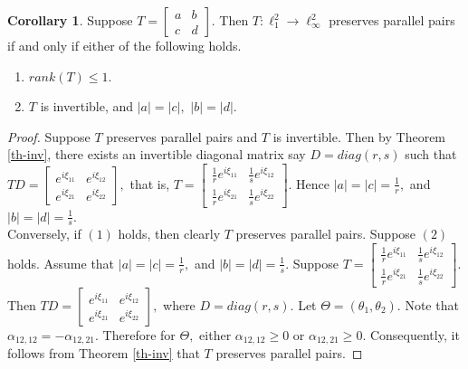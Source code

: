 \documentclass{amsart}
\theoremstyle{definition}
\newtheorem{cor}[theorem]{Corollary}
\theoremstyle{remark}
\numberwithin{equation}{section}
\begin{document}
\begin{cor}
	Suppose $T=\begin{bmatrix}
		a&b\\
		c&d
	\end{bmatrix}.$  Then $T:\ell_1^2\to \ell_\infty^2$ preserves parallel pairs if and only if either of the following holds.
\begin{enumerate}
	\item $rank(T)\leq 1.$
	\item $T$ is invertible, and $|a|=|c|,$ $ |b|=|d|.$
	\end{enumerate}
\end{cor}
\begin{proof}
	Suppose $T$ preserves parallel pairs and $T$ is invertible. Then by Theorem \ref{th-inv}, there exists an invertible diagonal matrix say $D=diag(r,s)$ such that $TD=\begin{bmatrix}
		e^{i\xi_{11}}&e^{i\xi_{12}}\\
		e^{i\xi_{21}}&e^{i\xi_{22}}
	\end{bmatrix},$ that is, 	$T=\begin{bmatrix}
		\frac{1}{r}e^{i\xi_{11}}& \frac{1}{s} e^{i\xi_{12}}\\
		\frac{1}{r} e^{i\xi_{21}}& \frac{1}{s} e^{i\xi_{22}}
	\end{bmatrix}.$ Hence $|a|=|c|=\frac{1}{r},$ and $ |b|=|d|=\frac{1}{s}.$\\
	Conversely, if $(1)$ holds, then clearly $T$ preserves parallel pairs. Suppose $(2)$ holds. Assume that $|a|=|c|=\frac{1}{r},$ and $ |b|=|d|=\frac{1}{s}.$ Suppose $T=\begin{bmatrix}
		\frac{1}{r}e^{i\xi_{11}}& \frac{1}{s} e^{i\xi_{12}}\\
		\frac{1}{r} e^{i\xi_{21}}& \frac{1}{s} e^{i\xi_{22}}
	\end{bmatrix}.$ Then  $TD=\begin{bmatrix}
		e^{i\xi_{11}}&e^{i\xi_{12}}\\
		e^{i\xi_{21}}&e^{i\xi_{22}}
	\end{bmatrix},$ where $D=diag(r,s).$ Let $\Theta=(\theta_1,\theta_2).$ Note that $\alpha_{12,12}=-\alpha_{12,21}.$ Therefore for $\Theta,$ either $\alpha_{12,12}\geq 0$ or $\alpha_{12,21}\geq 0.$ Consequently, it follows from Theorem \ref{th-inv} that $T$ preserves parallel pairs.
\end{proof}
\end{document}
